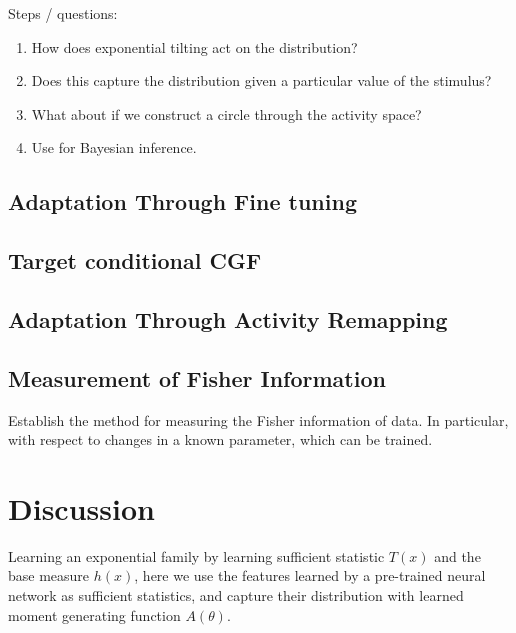 \documentclass[10pt]{article}      %
\begin{document}
Steps / questions:
\begin{enumerate}
  \item How does exponential tilting act on the distribution?
  \item Does this capture the distribution given a particular value of the stimulus?
  \item What about if we construct a circle through the activity space?
  \item Use for Bayesian inference.
\end{enumerate}



\subsection{Adaptation Through Fine tuning}





\subsection{Target conditional CGF}





\subsection{Adaptation Through Activity Remapping}






\subsection{Measurement of Fisher Information}

Establish the method for measuring the Fisher information of data. In particular, with respect to changes in a known parameter, which can be trained.




\section{Discussion}

Learning an exponential family by learning sufficient statistic $T(x)$ and the base measure $h(x)$, here we use the features learned by a pre-trained neural network as sufficient statistics, and capture their distribution with learned moment generating function $A(\theta)$.
\end{document}
